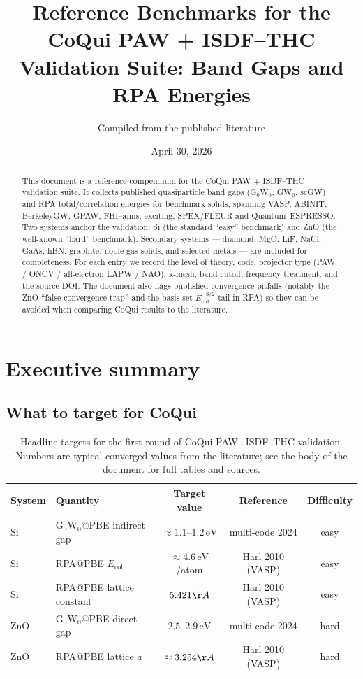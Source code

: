 \documentclass[11pt]{article}
\title{Reference Benchmarks for the CoQui PAW + ISDF--THC\\
       Validation Suite: Band Gaps and RPA Energies}
\author{Compiled from the published literature}
\date{April 30, 2026}
\newcommand{\eV}{\ensuremath{\,\mathrm{eV}}}
\begin{document}
\maketitle

\begin{abstract}
\noindent
This document is a reference compendium for the CoQui PAW + ISDF--THC
validation suite. It collects published quasiparticle band gaps (G$_0$W$_0$,
GW$_0$, scGW) and RPA total/correlation energies for benchmark solids,
spanning VASP, ABINIT, BerkeleyGW, GPAW, FHI--aims, exciting, SPEX/FLEUR
and Quantum~ESPRESSO. Two systems anchor the validation: Si (the standard
``easy'' benchmark) and ZnO (the well-known ``hard'' benchmark). Secondary
systems --- diamond, MgO, LiF, NaCl, GaAs, hBN, graphite, noble-gas solids,
and selected metals --- are included for completeness. For each entry we
record the level of theory, code, projector type (PAW / ONCV / all-electron
LAPW / NAO), k-mesh, band cutoff, frequency treatment, and the source DOI.
The document also flags published convergence pitfalls (notably the
ZnO ``false-convergence trap'' and the basis-set $E_{\mathrm{cut}}^{-3/2}$
tail in RPA) so they can be avoided when comparing CoQui results to the
literature.
\end{abstract}

\tableofcontents

\newpage

\section{Executive summary}

\subsection{What to target for CoQui}

\begin{table}[h]
\centering
\caption{Headline targets for the first round of CoQui PAW+ISDF--THC
validation. Numbers are typical converged values from the literature; see
the body of the document for full tables and sources.}
\label{tab:targets}
\small
\begin{tabular}{l l c c c}
\toprule
System & Quantity                 & Target value                   & Reference         & Difficulty \\
\midrule
Si     & G$_0$W$_0$@PBE indirect gap & $\approx 1.1$--$1.2\eV$       & multi-code 2024   & easy \\
Si     & RPA@PBE $E_{\mathrm{coh}}$  & $\approx 4.6\eV$/atom          & Harl 2010 (VASP)  & easy \\
Si     & RPA@PBE lattice constant   & $5.421\AA$                     & Harl 2010 (VASP)  & easy \\
ZnO    & G$_0$W$_0$@PBE direct gap   & $2.5$--$2.9\eV$                & multi-code 2024   & hard \\
ZnO    & RPA@PBE lattice $a$        & $\approx 3.254\AA$             & Harl 2010 (VASP)  & hard \\
\bottomrule
\end{tabular}
\end{table}
\end{document}
